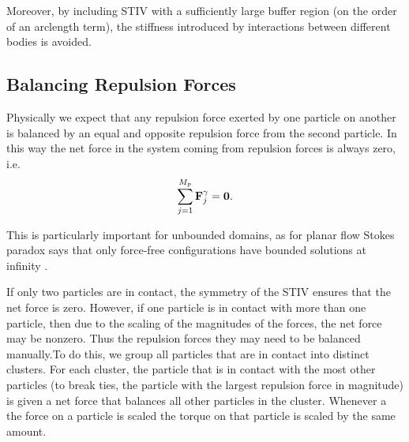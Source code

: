 \documentclass[preprint, 10pt]{elsarticle}
\begin{document}
Moreover, by including STIV with a sufficiently large buffer
region (on the order of an arclength term), the stiffness introduced by
interactions between different bodies is avoided. 


\subsection{Balancing Repulsion Forces}


Physically we expect that any repulsion force exerted by one particle on another is balanced by an equal and opposite repulsion force from the second particle.
In this way the net force in the system coming from repulsion forces is always
zero, i.e.
\begin{equation*}
	\sum\limits_{j=1}^{M_p} {\mathbf{F}}^\gamma_j = \mathbf{0}.
\end{equation*}

This is particularly important for unbounded domains, as for planar flow Stokes
paradox says that only force-free configurations have bounded solutions at
infinity \cite{Power1993, Pozrikidis1992}.

If only two particles are in contact, the symmetry of the STIV ensures that the
net force is zero. However, if one particle is in contact with more than one
particle, then due to the scaling of the magnitudes of the forces, the net force may be nonzero. Thus the repulsion forces they may need to be balanced manually.To do this, we group all particles that are in contact into distinct clusters.
For each cluster, the particle that is in contact with the most other particles
(to break ties, the particle with the largest repulsion force in magnitude) is
given a net force that balances all other particles in the
cluster. Whenever a the force on a particle is scaled the torque on that
particle is scaled by the same amount.
\end{document}
